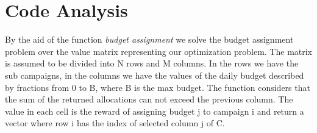 \section{Code Analysis}
\label{sec:Opt_Code Analysis}

By the aid of the function \textit{budget assignment} we solve the budget assignment problem over the value matrix representing our optimization problem. The matrix is assumed to be divided into N rows and M columns. In the rows we have the sub campaigns, in the columns we have the values of the daily budget described by fractions from 0 to B, where B is the max budget. The function considers that the sum of the returned allocations can not exceed the previous column. The value in each cell is the reward of assigning budget j to campaign i and return a vector where row i has the index of selected column j of C.
